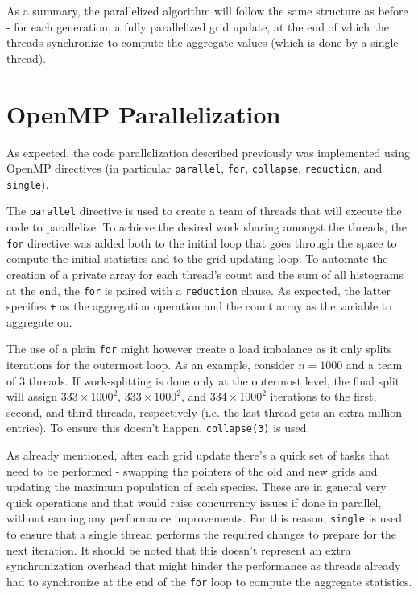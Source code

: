\documentclass{article}
\begin{document}
As a summary, the parallelized algorithm will follow the same structure as before
- for each generation, a fully parallelized grid update, at the end of which
the threads synchronize to compute the aggregate values (which is done by a single thread).

\section{OpenMP Parallelization}

As expected, the code parallelization described previously was implemented
 using OpenMP directives (in particular \texttt{parallel}, \texttt{for}, \texttt{collapse}, 
\texttt{reduction}, and \texttt{single}).

The \texttt{parallel} directive is used to create a team of threads 
that will execute the code to parallelize. To achieve the desired
work sharing amongst the threads, the \texttt{for} directive was added
both to the initial loop that goes through the space to compute the initial
statistics and to the grid updating loop. To automate the creation
of a private array for each thread's count and the sum of all histograms at
the end, the \texttt{for} is paired with a \texttt{reduction} clause. As expected,
the latter specifies \texttt{+} as the aggregation operation and the count
array as the variable to aggregate on.

The use of a plain \texttt{for} might however create a load imbalance as it
only splits iterations for the outermost loop. As an example, consider $n=1000$
and a team of 3 threads. If work-splitting is done only at the outermost level,
the final split will assign $333 \times 1000^2$, $333 \times 1000^2$, and $334 \times 1000^2$
iterations to the first, second, and third threads, respectively
(i.e. the last thread gets an extra million entries). To ensure this doesn't happen,
\texttt{collapse(3)} is used.

As already mentioned, after each grid update there's a quick set of tasks that
need to be performed - swapping the pointers of the old and new grids and updating 
the maximum population of each species. These are in general very quick operations
and that would raise concurrency issues if done in parallel, without earning
any performance improvements. For this reason, \texttt{single} is used to ensure
that a single thread performs the required changes to prepare for the next iteration.
It should be noted that this doesn't represent an extra synchronization overhead that might
hinder the performance as threads already had to synchronize at the end of the \texttt{for}
loop to compute the aggregate statistics.
\end{document}
